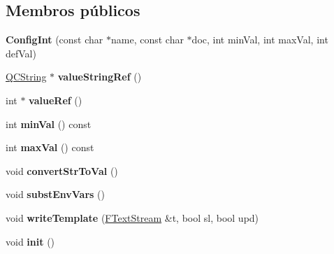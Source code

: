\subsection*{Membros públicos}
\begin{DoxyCompactItemize}
\item 
\hypertarget{class_config_int_a0b1fdf5da2ff15123c2d8db0bad0f67d}{{\bfseries Config\-Int} (const char $\ast$name, const char $\ast$doc, int min\-Val, int max\-Val, int def\-Val)}\label{class_config_int_a0b1fdf5da2ff15123c2d8db0bad0f67d}

\item 
\hypertarget{class_config_int_a0c7ffe0fff991390d97a629f692a5854}{\hyperlink{class_q_c_string}{Q\-C\-String} $\ast$ {\bfseries value\-String\-Ref} ()}\label{class_config_int_a0c7ffe0fff991390d97a629f692a5854}

\item 
\hypertarget{class_config_int_a3e0fdf101c1ad2a03e61471ff3a379a0}{int $\ast$ {\bfseries value\-Ref} ()}\label{class_config_int_a3e0fdf101c1ad2a03e61471ff3a379a0}

\item 
\hypertarget{class_config_int_a89e3d61b056638d9d44366dd3a064b6c}{int {\bfseries min\-Val} () const }\label{class_config_int_a89e3d61b056638d9d44366dd3a064b6c}

\item 
\hypertarget{class_config_int_ae0f8305087ec20aed794910f0e12af43}{int {\bfseries max\-Val} () const }\label{class_config_int_ae0f8305087ec20aed794910f0e12af43}

\item 
\hypertarget{class_config_int_adf2580bb1cb265aed049fd1553c658c2}{void {\bfseries convert\-Str\-To\-Val} ()}\label{class_config_int_adf2580bb1cb265aed049fd1553c658c2}

\item 
\hypertarget{class_config_int_a79866440425087f224d4f77311efad6a}{void {\bfseries subst\-Env\-Vars} ()}\label{class_config_int_a79866440425087f224d4f77311efad6a}

\item 
\hypertarget{class_config_int_a4972a64bbfa8f975c5704239e71c4811}{void {\bfseries write\-Template} (\hyperlink{class_f_text_stream}{F\-Text\-Stream} \&t, bool sl, bool upd)}\label{class_config_int_a4972a64bbfa8f975c5704239e71c4811}

\item 
\hypertarget{class_config_int_a02fd73d861ef2e4aabb38c0c9ff82947}{void {\bfseries init} ()}\label{class_config_int_a02fd73d861ef2e4aabb38c0c9ff82947}

\end{DoxyCompactItemize}
